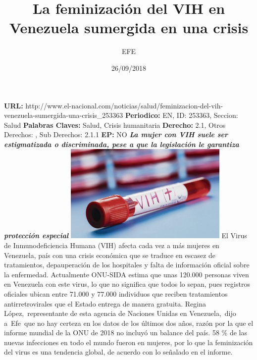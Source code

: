 \documentclass{article}%
\title{\textbf{La feminización del VIH en Venezuela sumergida en una crisis}}%
\author{EFE}%
\date{26/09/2018}%
\begin{document}
%
\normalsize%
\maketitle%
\textbf{URL: }%
http://www.el{-}nacional.com/noticias/salud/feminizacion{-}del{-}vih{-}venezuela{-}sumergida{-}una{-}crisis\_253363\newline%
%
\textbf{Periodico: }%
EN, %
ID: %
253363, %
Seccion: %
Salud\newline%
%
\textbf{Palabras Claves: }%
Salud, Crisis humanitaria\newline%
%
\textbf{Derecho: }%
2.1, %
Otros Derechos: %
, %
Sub Derechos: %
2.1.1\newline%
%
\textbf{EP: }%
NO\newline%
\newline%
%
\textbf{\textit{La mujer con VIH suele ser estigmatizada o discriminada, pese a que la legislación le garantiza protección especial}}%
\newline%
\newline%
%
\includegraphics[width=300px]{93.jpg}%
\newline%
%
El Virus de Inmunodeficiencia Humana (VIH) afecta cada vez a más mujeres en Venezuela, país con una crisis económica que se traduce en escasez de tratamientos, depauperación de los hospitales y falta de información oficial sobre la enfermedad.%
\newline%
%
Actualmente ONU{-}SIDA estima que unas 120.000 personas viven en Venezuela con este virus, lo que no significa que todos lo sepan, pues registros oficiales ubican entre 71.000 y 77.000 individuos que reciben tratamientos antirretrovirales que el Estado entrega de manera gratuita.%
\newline%
%
Regina López,~representante de esta agencia de Naciones Unidas en Venezuela,~dijo a~Efe~que no hay certeza en los datos de los últimos dos años, razón por la que el informe mundial de la ONU de 2018 no incluyó un balance del país.%
\newline%
%
58 \% de las nuevas infecciones en todo el mundo fueron en mujeres, por lo que la feminización del virus es una tendencia global, de acuerdo con lo señalado en el informe.%
\end{document}

